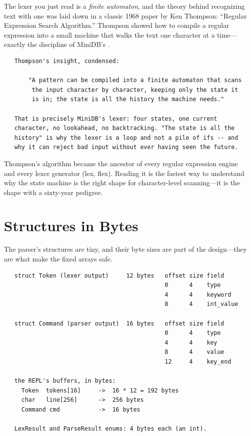 \begin{researchnote}
The lexer you just read is a \emph{finite automaton}, and the theory
behind recognizing text with one was laid down in a classic 1968 paper
by Ken Thompson: ``Regular Expression Search Algorithm.'' Thompson
showed how to compile a regular expression into a small machine that
walks the text one character at a time---exactly the discipline of
MiniDB's .

\begin{verbatim}
   Thompson's insight, condensed:

       "A pattern can be compiled into a finite automaton that scans
        the input character by character, keeping only the state it
        is in; the state is all the history the machine needs."

   That is precisely MiniDB's lexer: four states, one current
   character, no lookahead, no backtracking. "The state is all the
   history" is why the lexer is a loop and not a pile of ifs -- and
   why it can reject bad input without ever having seen the future.
\end{verbatim}

Thompson's algorithm became the ancestor of every regular expression
engine and every lexer generator (lex, flex). Reading it is the
fastest way to understand why the state machine is the right shape
for character-level scanning---it is the shape with a sixty-year
pedigree.

\end{researchnote}

\section{Structures in Bytes}

The parser's structures are tiny, and their byte sizes are part of the
design---they are what make the fixed arrays safe.

\begin{verbatim}
   struct Token (lexer output)     12 bytes   offset size field
                                              0      4    type
                                              4      4    keyword
                                              8      4    int_value

   struct Command (parser output)  16 bytes   offset size field
                                              0      4    type
                                              4      4    key
                                              8      4    value
                                              12     4    key_end

   the REPL's buffers, in bytes:
     Token  tokens[16]     ->  16 * 12 = 192 bytes
     char   line[256]      ->  256 bytes
     Command cmd           ->  16 bytes

   LexResult and ParseResult enums: 4 bytes each (an int).
\end{verbatim}

